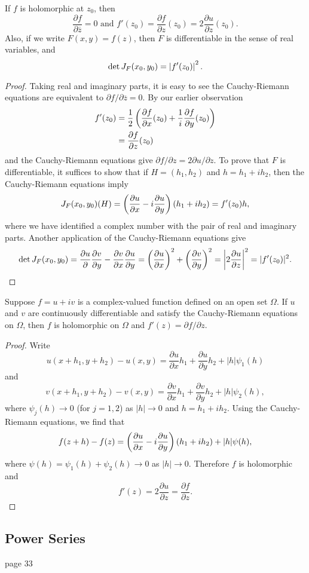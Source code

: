 \documentclass{exam}
\begin{document}
\noqed
\begin{proposition}\label{prop:main}
    If $f$ is holomorphic at $z_0$, then
    $$\frac{\partial f}{\partial \overline{z}} = 0 \text{ and } 
    f'(z_0) = \frac{\partial f}{\partial z}(z_0) = 2\frac{\partial u}{\partial z}(z_0).$$
    Also, if we write $F(x, y) = f(z)$, then $F$ is differentiable in the sense of real variables, and
    $$\det{J_F}(x_0, y_0) = \left| f'(z_0) \right|^2.$$
\end{proposition}
\yesqed
\begin{proof}
    Taking real and imaginary parts, it is easy to see the Cauchy-Riemann equations are equivalent to $\partial f / \partial \overline{z} = 0$.
    By our earlier observation
    \begin{align*}
        f'(z_0) &= \frac{1}{2}\left( \frac{\partial f}{\partial x}(z_0) + \frac{1}{i}\frac{\partial f}{\partial y}(z_0) \right) \\
        &= \frac{\partial f}{\partial z}(z_0)
    \end{align*}
    and the Cauchy-Riemann equations give $\partial f / \partial z = 2\partial u / \partial z$. To prove that $F$ is differentiable,
    it suffices to show that if $H = (h_1, h_2)$ and $h = h_1 + ih_2$, then the Cauchy-Riemann equations imply
    $$J_F(x_0, y_0)(H) = \left( \frac{\partial u}{\partial x} - i\frac{\partial u}{\partial y} \right)(h_1 + ih_2) = f'(z_0)h,$$
    where we have identified a complex number with the pair of real and imaginary parts. Another application of the Cauchy-Riemann equations
    give
    $$\det{J_F}(x_0, y_0) = \frac{\partial u}{\partial }\frac{\partial v}{\partial y} - \frac{\partial v}{\partial x}\frac{\partial u}{\partial y}
    = \left( \frac{\partial u}{\partial x} \right)^2 + \left( \frac{\partial v}{\partial y} \right)^2 = \left| 2\frac{\partial u}{\partial z} \right|^2 = |f'(z_0)|^2.$$
\end{proof}

\noqed
\begin{theorem}\label{thm:main}
    Suppose $f = u + iv$ is a complex-valued function defined on an open set $\Omega$. If $u$ and $v$ are continuously differentiable 
    and satisfy the Cauchy-Riemann equations on $\Omega$, then $f$ is holomorphic on $\Omega$ and $f'(z) = \partial f / \partial z$.
\end{theorem}
\yesqed
\begin{proof}
    Write 
    $$u(x + h_1, y + h_2) - u(x, y) = \frac{\partial u}{\partial x}h_1 + \frac{\partial u}{\partial y}h_2 + |h|\psi_1(h)$$
    and
    $$v(x + h_1, y + h_2) - v(x, y) = \frac{\partial v}{\partial x}h_1 + \frac{\partial v}{\partial y}h_2 + |h|\psi_2(h),$$
    where $\psi_j (h)\to 0$ (for $j = 1,2$) as $|h|\to 0$ and $h = h_1 + ih_2$. Using the Cauchy-Riemann equations, we find that
    $$f(z + h) - f(z) = \left( \frac{\partial u}{\partial x} - i\frac{\partial u}{\partial y} \right)(h_1 + ih_2) + |h|\psi(h),$$
    where $\psi(h) = \psi_1(h) + \psi_2(h)\to 0$ as $|h|\to 0$. Therefore $f$ is holomorphic and 
    $$f'(z) = 2\frac{\partial u}{\partial z} = \frac{\partial f}{\partial z}.$$
\end{proof}


\subsection{Power Series}
page 33
\end{document}
